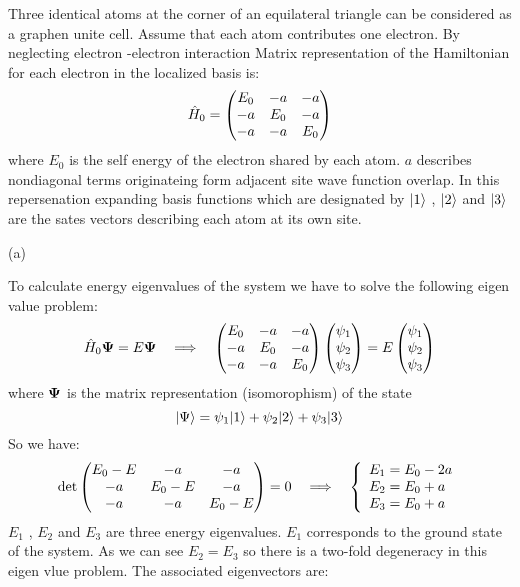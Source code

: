 \begin{homeworkProblem}
Three identical atoms at the corner of  an equilateral triangle can be considered as  a graphen unite cell. Assume that each atom contributes one electron. By neglecting electron -electron interaction Matrix representation of the Hamiltonian for each electron in the localized basis is:
\begin{equation}
\Hat{H}_0=
\begin{pmatrix}
E_0 & -a &-a\\
-a&E_0&-a\\
-a&-a&E_0
\end{pmatrix}
\end{equation}
where $E_0$ is the self energy of the electron shared by each atom. $a$ describes nondiagonal terms originateing form adjacent site wave function overlap. In this repersenation expanding basis functions which are designated by $|1\rangle$ , $|2\rangle$ and $|3\rangle$ are the sates vectors describing each atom at its own site. 


\begin{homeworkSection}{(a)}

To calculate energy eigenvalues of the system we have to solve the following eigen value problem:
\begin{equation}
\Hat{H}_0\mathbf{\Psi}=E\mathbf{\Psi}\quad\Longrightarrow\quad 
\begin{pmatrix}
E_0 & -a &-a\\
-a&E_0&-a\\
-a&-a&E_0
\end{pmatrix}
\begin{pmatrix}
\psi_1\\
\psi_2\\
\psi_3
\end{pmatrix}
=E\begin{pmatrix}
\psi_1\\
\psi_2\\
\psi_3
\end{pmatrix}
\end{equation}
where $\mathbf{\Psi}$ is the matrix representation (isomorophism) of the state 
$$|\Psi\rangle=\psi_1|1\rangle+\psi_2|2\rangle+\psi_3|3\rangle$$
So we have:
\begin{equation}
\det
\begin{pmatrix}
E_0-E & -a &-a\\
-a&E_0-E&-a\\
-a&-a&E_0-E
\end{pmatrix}
=0
\quad\Longrightarrow\quad
\left\{
\begin{array}{l}
E_1=E_0-2a\\
E_2=E_0+a\\
E_3=E_0+a
\end{array}
\right.
\end{equation}
$E_1$ , $E_2$ and $E_3$ are three energy eigenvalues. $E_1$ corresponds to the ground state of the system. As we can see $E_2=E_3$ so there is a two-fold degeneracy  in this eigen vlue problem.
 The associated eigenvectors are:


\end{homeworkSection}
\end{homeworkProblem}
